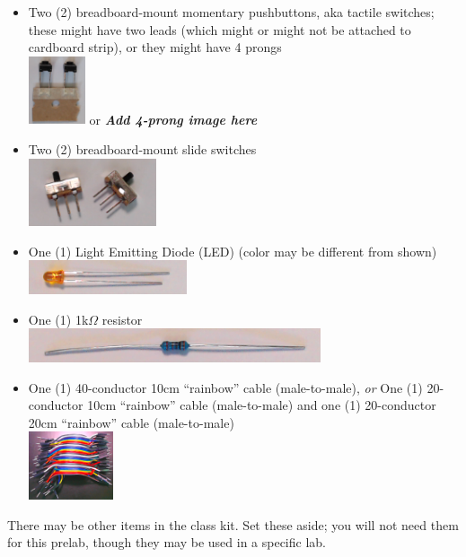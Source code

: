 \begin{itemize}
    \item Two (2) breadboard-mount momentary pushbuttons, aka tactile switches;
        these might have two leads (which might or might not be attached to cardboard strip), or they might have 4 prongs \\
        \includegraphics[height=2cm]{inventory/buttons-2pin} \hspace{1cm} or
        \hspace{1cm} \textbf{\textit{Add 4-prong image here}} %
    \item Two (2) breadboard-mount slide switches \\
        \includegraphics[height=2cm]{inventory/sliders}
    \displaymoduleitem
    \item One (1) Light Emitting Diode (LED) (color may be different from shown) \\
        \includegraphics[height=1cm]{inventory/led}
    \item One (1) 1k$\Omega$ resistor \\
        \includegraphics[height=1cm]{inventory/resistor}
    \item One (1) 40-conductor 10cm ``rainbow'' cable (male-to-male), \textit{or} One (1) 20-conductor 10cm ``rainbow'' cable (male-to-male) and one (1) 20-conductor 20cm ``rainbow'' cable (male-to-male) \\
        \includegraphics[height=2cm]{inventory/mm-cable}
    \fmcableitem
\end{itemize}

There may be other items in the class kit.
Set these aside;
you will not need them for this prelab, though they may be used in a specific lab.
